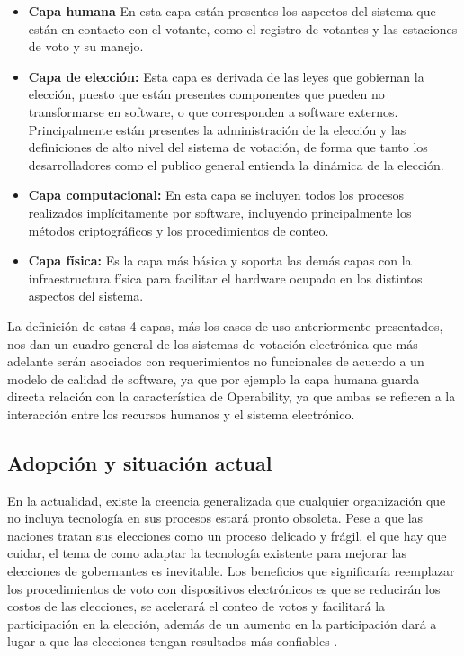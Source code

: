 \begin{itemize}
	\item \textbf {Capa humana} En esta capa están presentes los aspectos
		del sistema que están en contacto con el votante, como el registro
		de votantes y las estaciones de voto y su manejo.	
	
	\item \textbf {Capa de elección:}  Esta capa es derivada de las leyes que 
		gobiernan la elección, puesto que están presentes componentes
		que pueden no transformarse en software, o que corresponden a 
		software externos. Principalmente están presentes la administración
		de la elección y las definiciones de alto nivel del sistema de votación,
		de forma que tanto los desarrolladores como el publico general entienda
		la dinámica de la elección.
			
	\item \textbf{Capa computacional:} En esta capa se incluyen todos los procesos
		realizados implícitamente por software, incluyendo principalmente los 
		métodos criptográficos y los procedimientos de conteo.
			
	\item \textbf{Capa física:} Es la capa más básica y soporta las demás capas
		con la infraestructura física para facilitar el hardware ocupado en los distintos
		aspectos del sistema.	
\end{itemize}


La definición de estas 4 capas, más los casos de uso anteriormente presentados, nos dan un
cuadro general de los sistemas de votación electrónica que más adelante serán asociados
con requerimientos no funcionales de acuerdo a un modelo de calidad de software, ya que por ejemplo la capa humana
guarda directa relación con la característica de Operability, ya que ambas se refieren a
la interacción entre los recursos humanos y el sistema electrónico. 

\setlength{\parindent}{1cm}
\setlength{\parskip}{5pt}

\newpage
\subsection{Adopción y situación actual}

En la actualidad, existe la creencia generalizada que cualquier organización que no incluya
tecnología en sus procesos estará pronto obsoleta. Pese a que las naciones tratan sus elecciones
como un proceso delicado y frágil, el que hay que cuidar, el tema de como adaptar la tecnología
existente para mejorar las elecciones de gobernantes es inevitable. Los beneficios que significaría 
reemplazar los procedimientos de voto con dispositivos electrónicos es que se reducirán los 
costos de las elecciones, se acelerará el conteo de votos y facilitará la participación en la elección, 
además de un aumento en la participación dará a lugar a que las elecciones tengan 
resultados más confiables \cite{Kucharczyk2010}.

